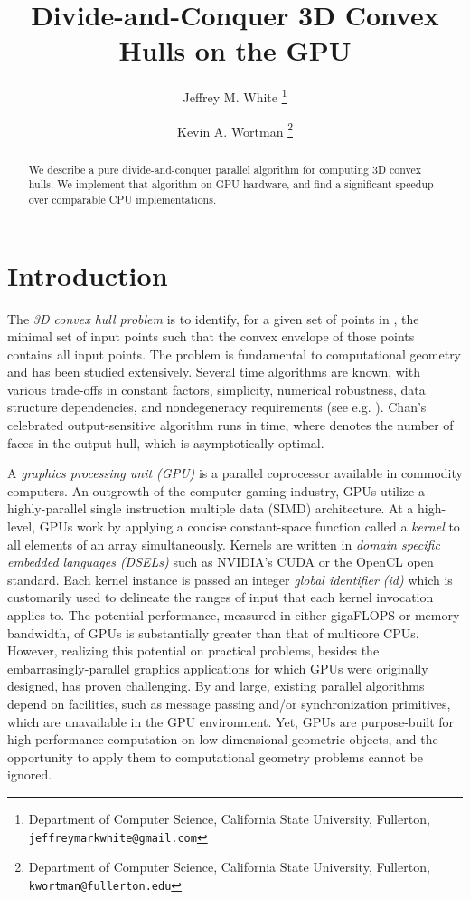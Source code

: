 \documentclass{article}
\title{Divide-and-Conquer 3D Convex Hulls on the GPU}
\author{
Jeffrey M. White \thanks{Department of Computer Science,
California State University, Fullerton, {\tt jeffreymarkwhite@gmail.com}}
\and
Kevin A. Wortman \thanks{Department of Computer Science,
California State University, Fullerton, {\tt kwortman@fullerton.edu}}
}
\begin{document}
\thispagestyle{empty}
\maketitle


\begin{abstract}
We describe a pure divide-and-conquer parallel algorithm for computing 3D convex hulls. We implement that algorithm on GPU hardware, and find a significant speedup over comparable CPU implementations.
\end{abstract}

\section{Introduction}

The \emph{3D convex hull problem} is to identify, for a given set of  points in , the minimal set of input points such that the convex envelope of those points contains all input points. The problem is fundamental to computational geometry and has been studied extensively. Several  time algorithms are known, with various trade-offs in constant factors, simplicity, numerical robustness, data structure dependencies, and nondegeneracy requirements  (see e.g. \cite{Akl1978219} \cite{Barber:1996:QAC:235815.235821} \cite{springerlink:10.1007/BF02573985} \cite{Eddy:1977:NCH:355759.355766}  \cite{kirkpatrick:287} \cite{Preparata:1977:CHF:359423.359430} \cite{seidel81}). Chan's celebrated output-sensitive algorithm \cite{springerlink:10.1007/BF02712873} runs in  time, where  denotes the number of faces in the output hull, which is asymptotically optimal.

A \emph{graphics processing unit (GPU)} is a parallel coprocessor available in commodity computers. An outgrowth of the computer gaming industry, GPUs utilize a highly-parallel single instruction multiple data (SIMD) architecture. At a high-level, GPUs work by applying a concise constant-space function called a \emph{kernel} to all elements of an array simultaneously. Kernels are written in \emph{domain specific embedded languages (DSELs)} such as NVIDIA's CUDA \cite{CUDAGuide2.0} or the OpenCL \cite{Opencl_theopencl} open standard. Each kernel instance is passed an integer \emph{global identifier (id)} which is customarily used to delineate the ranges of input that each kernel invocation applies to. The potential performance, measured in either gigaFLOPS or memory bandwidth, of GPUs is substantially greater than that of multicore CPUs. However, realizing this potential on practical problems, besides the embarrasingly-parallel graphics applications for which GPUs were originally designed, has proven challenging. By and large, existing parallel algorithms depend on facilities, such as message passing and/or synchronization primitives, which are unavailable in the GPU environment. Yet, GPUs are purpose-built for high performance computation on low-dimensional geometric objects, and the opportunity to apply them to computational geometry problems cannot be ignored.
\end{document}
